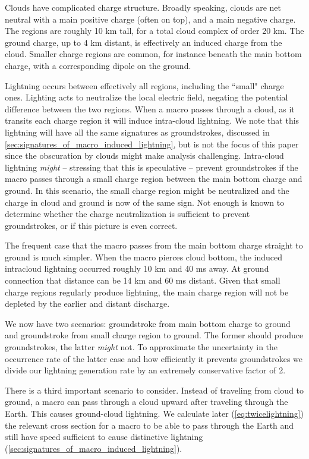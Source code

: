 \documentclass[%
 reprint,
 amsmath,amssymb,
 aps,
]{revtex4-2}
\newcommand{\vtwo}[1]{{\color{red} #1}}
\begin{document}
        \vtwo{
        Clouds have complicated charge structure. Broadly speaking, clouds are net neutral with a main positive charge (often on top), and a main negative charge. The regions are roughly 10 km tall, for a total cloud complex of order 20 km. The ground charge, up to 4 km distant, is effectively an induced charge from the cloud. Smaller charge regions are common, for instance beneath the main bottom charge, with a corresponding dipole on the ground.
        
        Lightning occurs between effectively all regions, including the ``small" charge ones. Lighting acts to neutralize the local electric field, negating the potential difference between the two regions. When a macro passes through a cloud, as it transits each charge region it will induce intra-cloud lightning. We note that this lightning will have all the same signatures as groundstrokes, discussed in \ref{sec:signatures_of_macro_induced_lightning}, but is not the focus of this paper since the obscuration by clouds might make analysis challenging. Intra-cloud lightning \textit{might} -- stressing that this is speculative -- prevent groundstrokes if the macro passes through a small charge region between the main bottom charge and ground. In this scenario, the small charge region might be neutralized and the charge in cloud and ground is now of the same sign. Not enough is known to determine whether the charge neutralization is sufficient to prevent groundstrokes, or if this picture is even correct.
        
        The frequent case that the macro passes from the main bottom charge straight to ground is much simpler. When the macro pierces cloud bottom, the induced intracloud lightning occurred roughly 10 km and 40 ms away. At ground connection that distance can be 14 km and 60 ms distant. Given that small charge regions regularly produce lightning, the main charge region will not be depleted by the earlier and distant discharge.

        We now have two scenarios: groundstroke from main bottom charge to ground and groundstroke from small charge region to ground. The former should produce groundstrokes, the latter \textit{might} not. To approximate the uncertainty in the occurrence rate of the latter case and how efficiently it prevents groundstrokes we divide our lightning generation rate by an extremely conservative factor of 2.
        
        There is a third important scenario to consider. Instead of traveling from cloud to ground, a macro can pass through a cloud upward after traveling through the Earth. This causes ground-cloud lightning. We calculate later (\ref{eq:twicelightning}) the relevant cross section for a macro to be able to pass through the Earth and still have speed sufficient to cause distinctive lightning (\ref{sec:signatures_of_macro_induced_lightning}).
        }
\end{document}

